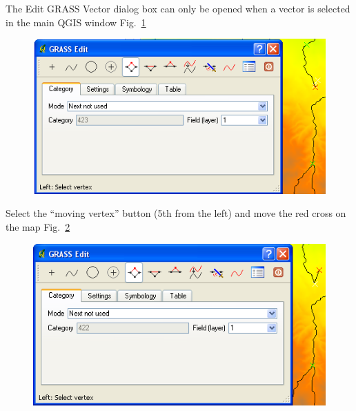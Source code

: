 The Edit GRASS Vector dialog box can only be opened when a vector is
selected in the main QGIS window Fig.~\ref{fig:qgis025}

\begin{figure}[htbp]
   \centering
   \includegraphics[scale=0.35]{qgis025.png}
   \caption{}
   \label{fig:qgis025}
\end{figure}

Select the ``moving vertex'' button (5th from the
left) and move the red cross on the map Fig.~\ref{fig:qgis026}

\begin{figure}[htbp]
   \centering
   \includegraphics[scale=0.35]{qgis026.png}
   \caption{}
   \label{fig:qgis026}
\end{figure}

